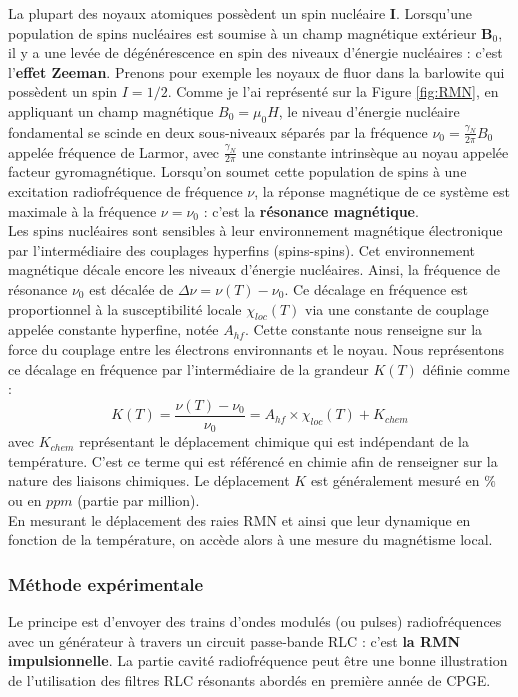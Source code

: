 La plupart des noyaux atomiques possèdent un spin nucléaire $\mathbf{I}$. Lorsqu'une population de spins nucléaires est soumise à un champ magnétique extérieur $\mathbf{B}_0$, il y a une levée de dégénérescence en spin des niveaux d'énergie nucléaires : c'est l'\textbf{effet Zeeman}. Prenons pour exemple les noyaux de fluor dans la barlowite qui possèdent un spin $I=1/2$. Comme je l'ai représenté sur la Figure \ref{fig:RMN}, en appliquant un champ magnétique $B_0=\mu_0H$, le niveau d'énergie nucléaire fondamental se scinde en deux sous-niveaux séparés par la fréquence $\nu_{0}=\frac{\gamma_N}{2\pi}B_0$ appelée fréquence de Larmor, avec $\frac{\gamma_N}{2\pi}$ une constante intrinsèque au noyau appelée facteur gyromagnétique. Lorsqu'on soumet cette population de spins à une excitation radiofréquence de fréquence $\nu$, la réponse magnétique de ce système est maximale à la fréquence $\nu=\nu_0$ : c'est la \textbf{résonance magnétique}. %
\\
Les spins nucléaires sont sensibles à leur environnement magnétique électronique par l'intermédiaire des couplages hyperfins (spins-spins). Cet environnement magnétique décale encore les niveaux d'énergie nucléaires. Ainsi, la fréquence de résonance $\nu_0$ est décalée de $\Delta\nu=\nu(T)-\nu_0$. Ce décalage en fréquence est proportionnel à la susceptibilité locale $\chi_{loc}(T)$ via une constante de couplage appelée constante hyperfine, notée $A_{hf}$. Cette constante nous renseigne sur la force du couplage entre les électrons environnants et le noyau. Nous représentons ce décalage en fréquence par l'intermédiaire de la grandeur $K(T)$ définie comme :
\begin{equation}
K(T) = \frac{\nu(T)-\nu_0}{\nu_0} = A_{hf}\times \chi_{loc}(T) + K_{chem}
\label{equ:shift}
\end{equation}
avec $K_{chem}$ représentant le déplacement chimique qui est indépendant de la température. C'est ce terme qui est référencé en chimie afin de renseigner sur la nature des liaisons chimiques. Le déplacement $K$ est généralement mesuré en $\%$ ou en $ppm$ (partie par million).\\
En mesurant le déplacement des raies RMN et ainsi que leur dynamique en fonction de la température, on accède alors à une mesure du magnétisme local.
\subsubsection{Méthode expérimentale}
Le principe est d'envoyer des trains d'ondes modulés (ou pulses) radiofréquences avec un générateur à travers un circuit passe-bande RLC : c'est \textbf{la RMN impulsionnelle}. La partie cavité radiofréquence peut être une bonne illustration de l'utilisation des filtres RLC résonants abordés en première année de CPGE.\\

